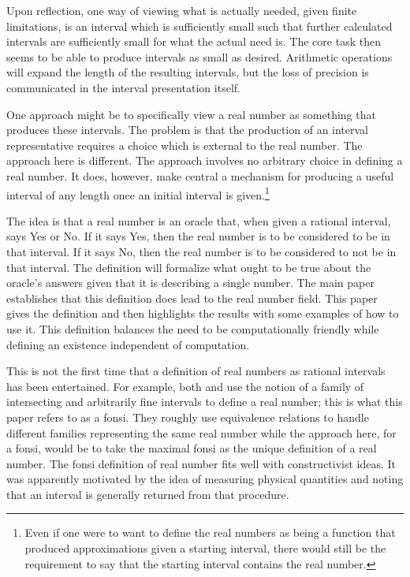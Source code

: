 \documentclass[12pt]{article}
\begin{document}
Upon reflection, one way of viewing what is actually needed, given finite limitations, is an interval which is sufficiently small such that further calculated intervals are sufficiently small for what the actual need is. The core task then seems to be able to produce intervals as small as desired. Arithmetic operations will expand the length of the resulting intervals, but the loss of precision is communicated in the interval presentation itself. 

One approach might be to specifically view a real number as something that produces these intervals. The problem is that the production of an interval representative requires a choice which is external to the real number. The approach here is different. The approach involves no arbitrary choice in defining a real number. It does, however, make central a mechanism for producing a useful interval of any length once an initial interval is given.\footnote{Even if one were to want to define the real numbers as being a function that produced approximations given a starting interval, there would still be the requirement to say that the starting interval contains the real number.}

The idea is that a real number is an oracle that, when given a rational interval, says Yes or No. If it says Yes, then the real number is to be considered to be in that interval. If it says No, then the real number is to be considered to not be in that interval. The definition will formalize what ought to be true about the oracle's answers given that it is describing a single number. The main paper establishes that this definition does lead to the real number field. This paper gives the definition and then highlights the results with some examples of how to use it. This definition balances the need to be computationally friendly while defining an existence independent of computation. 

This is not the first time that a definition of real numbers as rational intervals has been entertained. For example, both \cite{bridger} and \cite{bridges} use the notion of a family of intersecting and arbitrarily fine intervals to define a real number; this is what this paper refers to as a fonsi. They roughly use equivalence relations to handle different families representing the same real number while the approach here, for a fonsi, would be to take the maximal fonsi as the unique definition of a real number. The fonsi definition of real number fits well with constructivist ideas. It was apparently motivated by the idea of measuring physical quantities and noting that an interval is generally returned from that procedure. 
\end{document}
